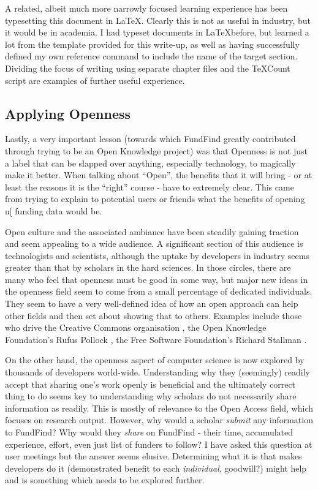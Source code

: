 A related, albeit much more narrowly focused learning experience has been typesetting this document in \LaTeX. Clearly this is not as useful in industry, but it would be in academia. I had typeset documents in \LaTeX before, but learned a lot from the template provided for this write-up, as well as having successfully defined my own reference command to include the name of the target section. Dividing the focus of writing using separate chapter files and the TeXCount \cite{texcount} script are examples of further useful experience.

\subsection{Applying Openness}
Lastly, a very important lesson (towards which FundFind greatly contributed through trying to be an Open Knowledge project) was that Openness is not just a label that can be slapped over anything, especially technology, to magically make it better. When talking about ``Open'', the benefits that it will bring - or at least the reasons it is the ``right'' course - have to extremely clear. This came from trying to explain to potential users or friends what the benefits of opening u[ funding data would be.

Open culture and the associated ambiance have been steadily gaining traction and seem appealing to a wide audience. A significant section of this audience is technologists and scientists, although the uptake by developers in industry seems greater than that by scholars in the hard sciences. In those circles, there are many who feel that openness must be good in some way, but major new ideas in the openness field seem to come from a small percentage of dedicated individuals. They seem to have a very well-defined idea of how an open approach can help other fields and then set about showing that to others. Examples include those who drive the Creative Commons organisation \cite{cc-team}, the Open Knowledge Foundation's Rufus Pollock \cite{rufus}, the Free Software Foundation's Richard Stallman \cite{rms}.

On the other hand, the openness aspect of computer science is now explored by thousands of developers world-wide. Understanding why they (seemingly) readily accept that sharing one's work openly is beneficial and the ultimately correct thing to do seems key to understanding why scholars do not necessarily share information as readily. This is mostly of relevance to the Open Access field, which focuses on research output. However, why would a scholar \emph{submit} any information to FundFind? Why would they \emph{share} on FundFind - their time, accumulated experience, effort, even just list of funders to follow? I have asked this question at user meetings but the answer seems elusive. Determining what it is that makes developers do it (demonstrated benefit to each \emph{individual}, goodwill?) might help and is something which needs to be explored further.


